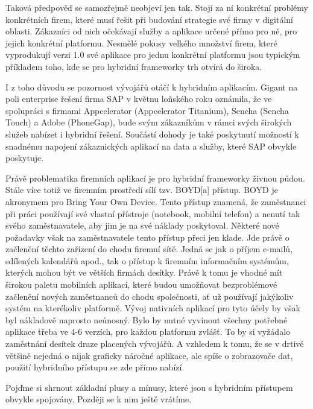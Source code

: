 Taková předpověď se samozřejmě neobjeví jen tak. Stojí za ní konkrétní problémy konkrétních firem, které musí řešit při budování strategie své firmy v digitální oblasti. Zákazníci od nich očekávají služby a aplikace určené přímo pro ně, pro jejich konkrétní platformu. Nesmělé pokusy velkého množství firem, které vyprodukují verzi 1.0 své aplikace pro jednu konkrétní platformu jsou typickým příkladem toho, kde se pro hybridní frameworky trh otvírá do široka.

I z toho důvodu se pozornost vývojářů otáčí k hybridním aplikacím. Gigant na poli enterprise řešení firma SAP v květnu loňského roku oznámila, že ve spolupráci s firmami Appcelerator (Appcelerator Titanium), Sencha (Sencha Touch) a Adobe (PhoneGap), bude svým zákazníkům v rámci svých širokých služeb nabízet i hybridní řešení. Součástí dohody je také poskytnutí možností k snadnému napojení zákaznických aplikací na data a služby, které SAP obvykle poskytuje. \cite{bii_hybrid_apps_report}

Právě problematika firemních aplikací je pro hybridní frameworky živnou půdou. Stále více totiž ve firemním prostředí sílí tzv. BOYD[a] přístup. BOYD je akronymem pro Bring Your Own Device. Tento přístup znamená, že zaměstnanci při práci používají své vlastní přístroje (notebook, mobilní telefon) a nenutí tak svého zaměstnavatele, aby jim je na své náklady poskytoval. Některé nové požadavky však na zaměstnavatele tento přístup přeci jen klade. Jde právě o začlenění těchto zařízení do chodu firemní sítě. Jedná se jak o příjem e-mailů, sdílených kalendářů apod., tak o přístup k firemním informačním systémům, kterých mohou být ve větších firmách desítky. Právě k tomu je vhodné mít širokou paletu mobilních aplikací, které budou umožňovat bezproblémové začlenění nových zaměstnanců do chodu společnosti, ať už používají jakýkoliv systém na kterékoliv platformě. Vývoj nativních aplikací pro tyto účely by však byl nákladově naprosto neúnosný. Bylo by nutné vyvinout všechny potřebné aplikace třeba ve 4-6 verzích, pro každou platformu zvlášť. To by si vyžádalo zaměstnání desítek draze placených vývojářů. A vzhledem k tomu, že se v drtivé většině nejedná o nijak graficky náročné aplikace, ale spíše o zobrazovače dat, použití hybridního přístupu se zde přímo nabízí. 

Pojďme si shrnout základní plusy a mínusy, které jsou s hybridním přístupem obvykle spojovány. Později se k nim ještě vrátíme.

